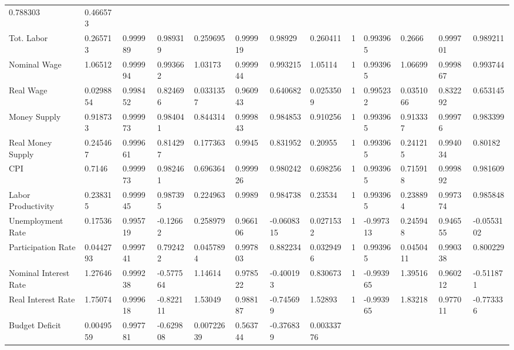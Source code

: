\documentclass[letterpaper,11pt]{article}
\theoremstyle{definition}
\begin{document}
\begin{spacing}{1.5}
\begin{table}
\begin{tabular}{lllllllllllll}
        0.788303 &         0.466573 \\Tot. Labor           &      0.265713 &       0.999989 &       0.989319 &      0.259695 &       0.999919 &        0.98929 &       0.260411 &               1 &        0.993965 &          0.2666 &         0.999701 &         0.989211 \\Nominal Wage          &       1.06512 &       0.999994 &       0.993662 &       1.03173 &       0.999944 &       0.993215 &        1.05114 &               1 &        0.993965 &         1.06699 &         0.999867 &         0.993744 \\Real Wage             &     0.0298854 &       0.998452 &       0.824696 &     0.0331357 &       0.960943 &       0.640682 &      0.0253509 &               1 &        0.995232 &       0.0351066 &         0.832292 &         0.653145 \\Money Supply          &      0.918733 &       0.999973 &       0.984041 &      0.844314 &       0.999843 &       0.984853 &       0.910256 &               1 &        0.993965 &        0.913337 &          0.99976 &         0.983399 \\Real Money Supply     &      0.245467 &       0.999661 &       0.814297 &      0.177363 &         0.9945 &       0.831952 &        0.20955 &               1 &        0.993965 &        0.241215 &         0.994034 &          0.80182 \\CPI                   &        0.7146 &       0.999973 &       0.982461 &      0.696364 &       0.999926 &       0.980242 &       0.698256 &               1 &        0.993965 &        0.715918 &         0.999892 &         0.981609 \\Labor Productivity    &      0.238315 &       0.999945 &       0.987395 &      0.224963 &         0.9989 &       0.984738 &        0.23534 &               1 &        0.993965 &        0.238894 &         0.997374 &         0.985848 \\Unemployment Rate     &       0.17536 &       0.995719 &       -0.12662 &      0.258979 &       0.966106 &     -0.0608315 &      0.0271532 &               1 &       -0.997313 &        0.245948 &         0.946555 &       -0.0553102 \\Participation Rate    &     0.0442793 &       0.999741 &       0.792422 &     0.0457894 &       0.997803 &       0.882234 &      0.0329496 &               1 &        0.993965 &       0.0450411 &         0.990338 &         0.800229 \\Nominal Interest Rate &       1.27646 &       0.999238 &      -0.577564 &       1.14614 &       0.978522 &      -0.400193 &       0.830673 &               1 &       -0.993965 &         1.39516 &         0.960212 &        -0.511871 \\Real Interest Rate    &       1.75074 &       0.999618 &      -0.822111 &       1.53049 &       0.988187 &      -0.745699 &        1.52893 &               1 &       -0.993965 &         1.83218 &         0.977011 &        -0.773336 \\Budget Deficit        &     0.0049559 &       0.997781 &      -0.629808 &    0.00722639 &       0.563744 &      -0.376839 &     0.00333776 &      
\end{tabular}
\end{table}
\end{spacing}
\end{document}
